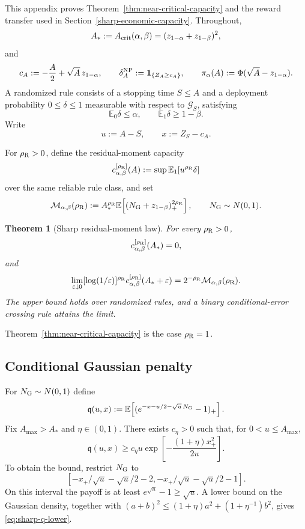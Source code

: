 \documentclass[11pt]{article}
\numberwithin{equation}{section}
\theoremstyle{plain}
\newtheorem{theorem}{Theorem}[section]
\theoremstyle{definition}
\theoremstyle{remark}
\newcommand{\Ezero}{\mathbb E_0}
\newcommand{\Eone}{\mathbb E_1}
\begin{document}
This appendix proves Theorem~\ref{thm:near-critical-capacity} and the reward transfer used in Section~\ref{sharp-economic-capacity}. Throughout,
\[
A_*:=A_{\rm crit}(\alpha,\beta)=(z_{1-\alpha}+z_{1-\beta})^2,
\]
and
\[
c_A:=-\frac A2+\sqrt A\,z_{1-\alpha},
\qquad
\delta_A^{\rm NP}:=\mathbf1_{\{Z_A\ge c_A\}},
\qquad
\pi_\alpha(A):=\Phi(\sqrt A-z_{1-\alpha}).
\]
A randomized rule consists of a stopping time $S\le A$ and a deployment probability $0\le\delta\le1$ measurable with respect to $\mathcal G_S$, satisfying
\[
\Ezero\delta\le\alpha,\qquad \Eone\delta\ge1-\beta.
\]
Write
\[
u:=A-S,\qquad x:=Z_S-c_A.
\]

For $\rho_{\rm R}>0$, define the residual-moment capacity
\[
c^{[\rho_{\rm R}]}_{\alpha,\beta}(A)
:=\sup\Eone[u^{\rho_{\rm R}}\delta]
\]
over the same reliable rule class, and set
\[
\mathcal M_{\alpha,\beta}(\rho_{\rm R})
:=A_*^{\rho_{\rm R}}
\mathbb E\!\left[(N_{\rm G}+z_{1-\beta})_+^{2\rho_{\rm R}}\right],
\qquad N_{\rm G}\sim N(0,1).
\]

\begin{theorem}[Sharp residual-moment law]\label{thm:sharp-residual-moment}
For every $\rho_{\rm R}>0$,
\[
c^{[\rho_{\rm R}]}_{\alpha,\beta}(A_*)=0,
\]
and
\[
\lim_{\varepsilon\downarrow0}
[\log(1/\varepsilon)]^{\rho_{\rm R}}
 c^{[\rho_{\rm R}]}_{\alpha,\beta}(A_*+\varepsilon)
=2^{-\rho_{\rm R}}\mathcal M_{\alpha,\beta}(\rho_{\rm R}).
\]
The upper bound holds over randomized rules, and a binary conditional-error crossing rule attains the limit.
\end{theorem}

Theorem~\ref{thm:near-critical-capacity} is the case $\rho_{\rm R}=1$.

\subsection{Conditional Gaussian penalty}

For $N_{\rm G}\sim N(0,1)$ define
\[
\mathfrak q(u,x)
:=\mathbb E\!\left[(e^{-x-u/2-\sqrt u\,N_{\rm G}}-1)_+\right].
\]
Fix $A_{\max}>A_*$ and $\eta\in(0,1)$. There exists $c_\eta>0$ such that, for $0<u\le A_{\max}$,
\begin{equation}\label{eq:sharp-q-lower}
\mathfrak q(u,x)
\ge c_\eta u
\exp\!\left[-\frac{(1+\eta)x_+^2}{2u}\right].
\end{equation}
To obtain the bound, restrict $N_{\rm G}$ to
\[
\left[-x_+/\sqrt u-\sqrt u/2-2,
      -x_+/\sqrt u-\sqrt u/2-1\right].
\]
On this interval the payoff is at least $e^{\sqrt u}-1\ge\sqrt u$. A lower bound on the Gaussian density, together with
$(a+b)^2\le(1+\eta)a^2+(1+\eta^{-1})b^2$, gives \eqref{eq:sharp-q-lower}.
\end{document}
